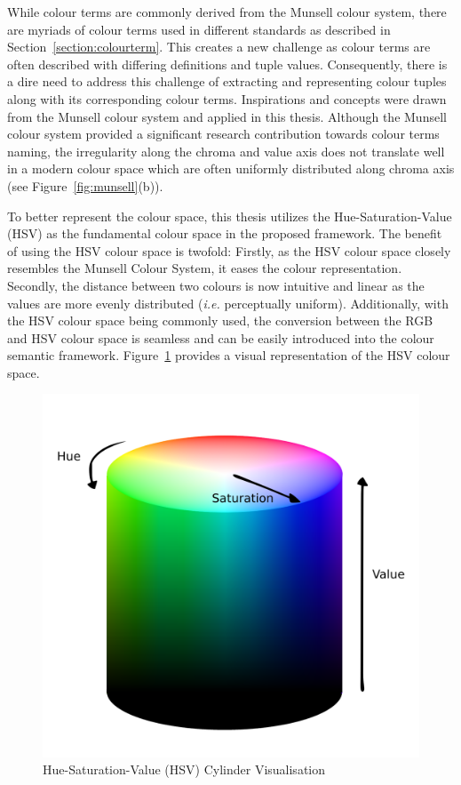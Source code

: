 While colour terms are commonly derived from the Munsell colour system, there are myriads of colour terms used in different standards as described in Section~\ref{section:colourterm}.
This creates a new challenge as colour terms are often described with differing definitions and tuple values.
Consequently, there is a dire need to address this challenge of extracting and representing colour tuples along with its corresponding colour terms.
Inspirations and concepts were drawn from the Munsell colour system and applied in this thesis.
Although the Munsell colour system provided a significant research contribution towards colour terms naming, the irregularity along the chroma and value axis does not translate well in a modern colour space which are often uniformly distributed along chroma axis (see Figure~\ref{fig:munsell}(b)).

To better represent the colour space, this thesis utilizes the Hue-Saturation-Value (HSV) as the fundamental colour space in the proposed framework.
The benefit of using the HSV colour space is twofold: Firstly, as the HSV colour space closely resembles the Munsell Colour System, it eases the colour representation.
Secondly, the distance between two colours is now intuitive and linear as the values are more evenly distributed (\emph{i.e.} perceptually uniform).
Additionally, with the HSV colour space being commonly used, the conversion between the RGB and HSV colour space is seamless and can be easily introduced into the colour semantic framework. Figure~\ref{fig:hsvcylinder} provides a visual representation of the HSV colour space.

\begin{figure}[hbt!]\centering
\includegraphics[width=.5\textwidth]{image/general/HSV.png}
\caption{Hue-Saturation-Value (HSV) Cylinder Visualisation}
\label{fig:hsvcylinder}
\end{figure}

